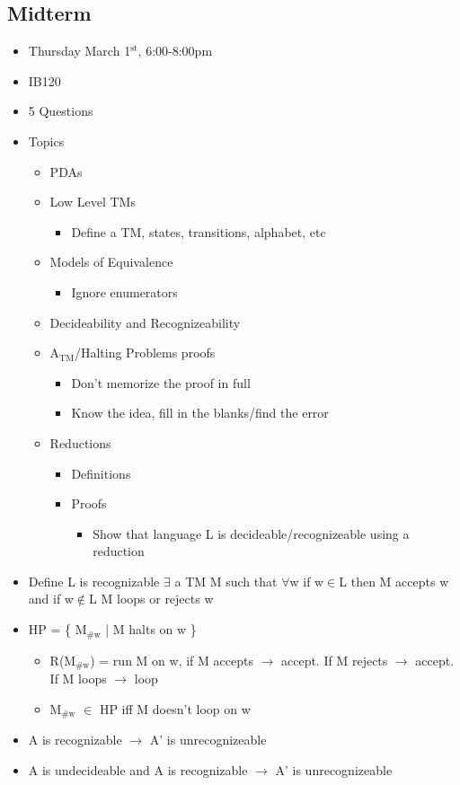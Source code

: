 \documentclass[11pt]{article}
\begin{document}
\subsection{Midterm}
\label{sec:org51c4a55}
\begin{itemize}
\item Thursday March 1\(^{\text{st}}\), 6:00-8:00pm
\item IB120
\item 5 Questions
\item Topics
\begin{itemize}
\item PDAs
\item Low Level TMs
\begin{itemize}
\item Define a TM, states, transitions, alphabet, etc
\end{itemize}
\item Models of Equivalence
\begin{itemize}
\item Ignore enumerators
\end{itemize}
\item Decideability and Recognizeability
\item A\(_{\text{TM}}\)/Halting Problems proofs
\begin{itemize}
\item Don't memorize the proof in full
\item Know the idea, fill in the blanks/find the error
\end{itemize}
\item Reductions
\begin{itemize}
\item Definitions
\item Proofs 
\begin{itemize}
\item Show that language L is decideable/recognizeable using a reduction
\end{itemize}
\end{itemize}
\end{itemize}
\item Define L is recognizable
\(\exists\) a TM M such that \(\forall\)w if w\(\in\)L then M accepts w and if w\(\notin\)L M loops or rejects w
\item HP = \{ M\(_{\text{\#w}}\) | M halts on w \}
\begin{itemize}
\item R(M\(_{\text{\#w}}\)) = run M on w, if M accepts \(\rightarrow\) accept. If M rejects \(\rightarrow\) accept. If M loops \(\rightarrow\) loop
\item M\(_{\text{\#w}}\) \(\in\) HP iff M doesn't loop on w
\end{itemize}
\item A is recognizable \textlnot{}\(\rightarrow\) A' is unrecognizeable
\item A is undecideable and A is recognizable \(\rightarrow\) A' is unrecognizeable
\end{itemize}
\end{document}
